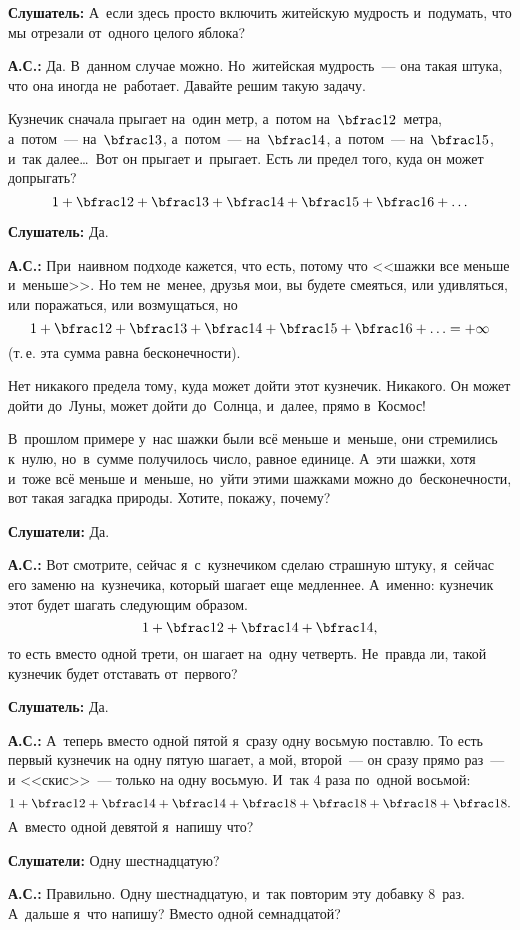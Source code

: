 \textbf{Слушатель:} А~если здесь просто включить житейскую мудрость и~подумать, что мы отрезали от~одного
целого яблока?

\textbf{А.С.:} Да. В~данном случае можно. Но~житейская мудрость~--- она такая штука, что она иногда
не~работает. Давайте решим такую задачу.

Кузнечик сначала прыгает на~один метр, а~потом на~$\bfrac12$~метра, а~потом~--- на~$\bfrac13$, а~потом~--- на~$\bfrac14$,
а~потом~--- на~$\bfrac15$, и~так далее\ldots\ Вот он прыгает и~прыгает. Есть ли предел того, куда он может
допрыгать?
$$
1+\bfrac12+\bfrac13+\bfrac14+\bfrac15+\bfrac16+\ldots
$$

\textbf{Слушатель:} Да.

\textbf{А.С.:} При~наивном подходе кажется, что есть, потому что <<шажки все меньше и~меньше>>. Но
тем не~менее, друзья мои, вы будете смеяться, или удивляться, или поражаться, или возмущаться, но
$$
1+\bfrac12+\bfrac13+\bfrac14+\bfrac15+\bfrac16+\ldots=+\infty
$$
(т.\,е. эта сумма равна бесконечности).

Нет никакого предела тому, куда может дойти этот кузнечик. Никакого. Он может дойти до~Луны, может
дойти до~Солнца, и~далее, прямо в~Космос!

В~прошлом примере у~нас шажки были всё меньше и~меньше, они стремились к~нулю, но~в~сумме
получилось число, равное единице. А~эти шажки, хотя и~тоже всё меньше и~меньше, но~уйти этими
шажками можно до~бесконечности, вот такая загадка природы. Хотите, покажу, почему?

\textbf{Слушатели:} Да.

\textbf{А.С.:} Вот смотрите, сейчас я~с~кузнечиком сделаю страшную штуку, я~сейчас его заменю
на~кузнечика, который шагает еще медленнее. А~именно: кузнечик этот будет шагать следующим образом.
$$1+\bfrac12+\bfrac14+\bfrac14,$$ то есть вместо одной трети, он шагает на~одну четверть. Не~правда ли, такой кузнечик
будет отставать от~первого?

\textbf{Слушатель:} Да.

\textbf{А.С.:} А~теперь вместо одной пятой я~сразу одну восьмую поставлю.
То есть первый кузнечик на одну пятую шагает, а мой, второй~--- он сразу прямо раз~--- и <<скис>>~--- только на одну восьмую.
И~так 4 раза
по~одной восьмой:
$$
1+\bfrac12+\bfrac14+\bfrac14+\bfrac18+\bfrac18+\bfrac18+\bfrac18.
$$
А~вместо одной девятой я~напишу что?

\textbf{Слушатели:} Одну шестнадцатую?

\textbf{А.С.:} Правильно. Одну шестнадцатую, и~так повторим эту добавку 8~раз. А~дальше я~что напишу? Вместо одной семнадцатой?

